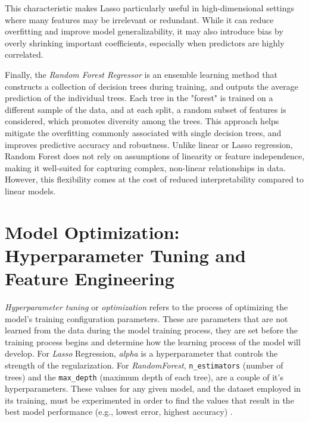 \documentclass[12pt]{report} %
\begin{document}
This characteristic makes Lasso particularly useful in high-dimensional settings where many features may be irrelevant or redundant. While it can reduce overfitting and improve model generalizability, it may also introduce bias by overly shrinking important coefficients, especially when predictors are highly correlated.

Finally, the \textit{Random Forest Regressor} \cite{random_forest_regressor} is an ensemble learning method that constructs a collection of decision trees during training, and outputs the average prediction of the individual trees. Each tree in the "forest" is trained on a different sample of the data, and at each split, a random subset of features is considered, which promotes diversity among the trees. This approach helps mitigate the overfitting commonly associated with single decision trees, and improves predictive accuracy and robustness. Unlike linear or Lasso regression, Random Forest does not rely on assumptions of linearity or feature independence, making it well-suited for capturing complex, non-linear relationships in data. However, this flexibility comes at the cost of reduced interpretability compared to linear models.




\section{Model Optimization: Hyperparameter Tuning and Feature Engineering}

\textit{Hyperparameter tuning} or \textit{optimization} refers to the process of optimizing the model's training configuration parameters. These are parameters that are not learned from the data during the model training process, they are set before the training process begins and determine how the learning process of the model will develop. For \textit{Lasso} Regression, \textit{alpha} is a hyperparameter that controls the strength of the regularization. For \textit{RandomForest}, \verb|n_estimators| (number of trees) and the \verb|max_depth| (maximum depth of each tree), are a couple of it's hyperparameters. These values for any given model, and the dataset employed in its training, must be experimented in order to find the values that result in the best model performance (e.g., lowest error, highest accuracy) \cite{AWSHyperparameterTuning}.
\end{document}
